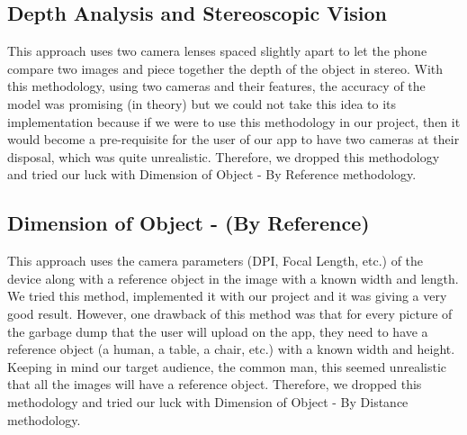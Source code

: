 \subsection{Depth Analysis and Stereoscopic Vision}
This approach uses two camera lenses spaced slightly apart to let the phone compare two images and piece together the depth of the object in stereo. With this methodology, using two cameras and their features, the accuracy of the model was promising (in theory) but we could not take this idea to its implementation because if we were to use this methodology in our project, then it would become a pre-requisite for the user of our app to have two cameras at their disposal, which was quite unrealistic. Therefore, we dropped this methodology and tried our luck with Dimension of Object - By Reference methodology. 
\subsection{Dimension of Object - (By Reference)}
This approach uses the camera parameters (DPI, Focal Length, etc.) of the device along with a reference object in the image with a known width and length. We tried this method, implemented it with our project and it was giving a very good result. However, one drawback of this method was that for every picture of the garbage dump that the user will upload on the app, they need to have a reference object (a human, a table, a chair, etc.) with a known width and height. Keeping in mind our target audience, the common man, this seemed unrealistic that all the images will have a reference object. Therefore, we dropped this methodology and tried our luck with Dimension of Object - By Distance methodology.
